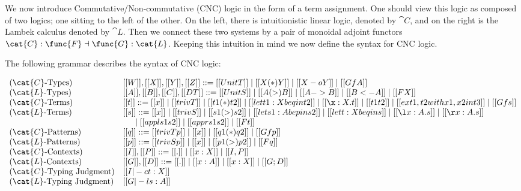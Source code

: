 We now introduce Commutative/Non-commutative (CNC) logic in the form
of a term assignment.  One should view this logic as composed of two
logics; one sitting to the left of the other.  On the left, there is
intuitionistic linear logic, denoted by $\cat{C}$, and on the right is
the Lambek calculus denoted by $\cat{L}$.  Then we connect these two
systems by a pair of monoidal adjoint functors $\cat{C} : \func{F}
\dashv \func{G} : \cat{L}$.  Keeping this intuition in mind we now
define the syntax for CNC logic.
\begin{definition}
  \label{def:Lambek-syntax}
  The following grammar describes the syntax of CNC logic:
  \begin{center}\vspace{-3px}\small
    \begin{math}
      \begin{array}{lll}        
        \text{($\cat{C}$-Types)} & [[W]],[[X]],[[Y]],[[Z]] ::= [[UnitT]] \mid [[X (*) Y]] \mid [[X -o Y]] \mid [[Gf A]]\\
        \text{($\cat{L}$-Types)} & [[A]],[[B]],[[C]],[[DT]] ::= [[UnitS]] \mid [[A (>) B]] \mid [[A -> B]] \mid [[B <- A]] \mid [[F X]]\\        
        \text{($\cat{C}$-Terms)} & [[t]] ::= [[x]] \mid [[trivT]] \mid [[t1 (*) t2]] \mid [[let t1 : X be q in t2]] \mid [[\x:X.t]] \mid [[t1 t2]] \mid [[ex t1 , t2 with x1 , x2 in t3]] \mid [[Gf s]]\\
        \text{($\cat{L}$-Terms)} & [[s]] ::= [[x]] \mid [[trivS]] \mid [[s1 (>) s2]] \mid [[let s1 : A be p in s2]] \mid [[let t : X be q in s]] \mid [[\l x : A.s]] \mid [[\r x : A . s]] \\
        & \,\,\,\,\,\,\,\,\,\mid [[appl s1 s2]] \mid [[appr s1 s2]] \mid [[F t]]\\        
        \text{($\cat{C}$-Patterns)} & [[q]] ::= [[trivTp]] \mid [[x]] \mid [[q1 (*) q2]] \mid [[Gf p]]\\
        \text{($\cat{L}$-Patterns)} & [[p]] ::= [[trivSp]] \mid [[x]] \mid [[p1 (>) p2]] \mid [[F q]]\\        
        \text{($\cat{C}$-Contexts)} & [[I]],[[P]] ::= [[.]] \mid [[x : X]] \mid [[I,P]]\\
        \text{($\cat{L}$-Contexts)} & [[G]],[[D]] ::= [[.]] \mid [[x : A]] \mid [[x : X]] \mid [[G;D]]\\        
        \text{($\cat{C}$-Typing Judgment)} & [[I |-c t : X]]\\
        \text{($\cat{L}$-Typing Judgment)} & [[G |-l s : A]]\\
      \end{array}
    \end{math}
  \end{center}
\end{definition}

